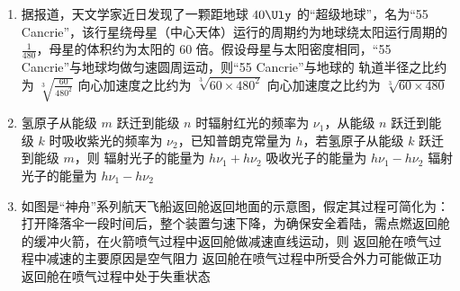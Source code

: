 \documentclass[\gkver]{gaokaozhenti}
\begin{document}
\begin{enumerate}
\item
据报道，天文学家近日发现了一颗距地球 $40\Uly$ 的“超级地球”，名为“55 Cancrie”，该行星绕母星（中心天体）运行的周期约为地球绕太阳运行周期的 $\frac{1}{480}$，母星的体积约为太阳的 60 倍。假设母星与太阳密度相同，“55 Cancrie”与地球均做匀速圆周运动，则“55 Cancrie”与地球的
{轨道半径之比约为 $\sqrt[3]{\frac{60}{480^{2}}}$}
{向心加速度之比约为 $\sqrt[3]{60\times480^{2}}$}
{向心加速度之比约为 $\sqrt[3]{60\times480}$}


\item
氢原子从能级 $m$ 跃迁到能级 $n$ 时辐射红光的频率为 $\nu_{1}$，从能级 $n$ 跃迁到能级 $k$ 时吸收紫光的频率为 $\nu_{2}$，已知普朗克常量为 $h$，若氢原子从能级 $k$ 跃迁到能级 $m$，则
{辐射光子的能量为 $h\nu_{1}+h\nu_{2}$}
{吸收光子的能量为 $h\nu_{1}-h\nu_{2}$}
{辐射光子的能量为 $h\nu_{1}-h\nu_{2}$}


\item
如图是“神舟”系列航天飞船返回舱返回地面的示意图，假定其过程可简化为：打开降落伞一段时间后，整个装置匀速下降，为确保安全着陆，需点燃返回舱的缓冲火箭，在火箭喷气过程中返回舱做减速直线运动，则
{返回舱在喷气过程中减速的主要原因是空气阻力}
{返回舱在喷气过程中所受合外力可能做正功}
{返回舱在喷气过程中处于失重状态}


\end{enumerate}
\end{document}
